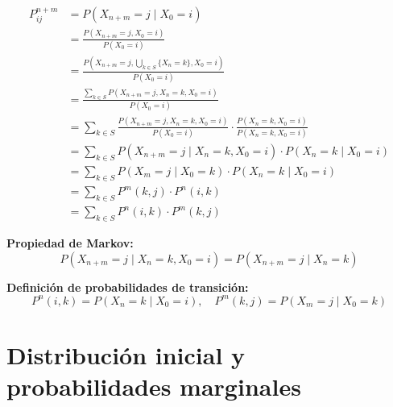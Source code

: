 \documentclass[12pt,a4paper]{article}
\begin{document}
\begin{align*}
P_{ij}^{n+m} &= P(X_{n+m}=j \mid X_0=i) \\
&= \frac{P(X_{n+m}=j, X_0=i)}{P(X_0=i)} \\
&= \frac{P(X_{n+m}=j, \bigcup_{k \in S} \{X_n=k\}, X_0=i)}{P(X_0=i)} \\
&= \frac{\sum_{k \in S} P(X_{n+m}=j, X_n=k, X_0=i)}{P(X_0=i)} \\
&= \sum_{k \in S} \frac{P(X_{n+m}=j, X_n=k, X_0=i)}{P(X_0=i)} \cdot \frac{P(X_n=k, X_0=i)}{P(X_n=k, X_0=i)} \\
&= \sum_{k \in S} P(X_{n+m}=j \mid X_n=k, X_0=i) \cdot P(X_n=k \mid X_0=i) \\
&= \sum_{k \in S} P(X_{m}=j \mid X_0=k) \cdot P(X_n=k \mid X_0=i) \\
&= \sum_{k \in S} P^m(k,j) \cdot P^n(i,k) \\
&= \sum_{k \in S} P^n(i,k) \cdot P^m(k,j)
\end{align*}

\textbf{Propiedad de Markov:}
\begin{equation*}
P(X_{n+m}=j \mid X_n=k, X_0=i) = P(X_{n+m}=j \mid X_n=k)
\end{equation*}

\textbf{Definición de probabilidades de transición:}
\begin{equation*}
P^n(i,k) = P(X_n=k \mid X_0=i), \quad P^m(k,j) = P(X_m=j \mid X_0=k)
\end{equation*}

\section*{Distribución inicial y probabilidades marginales}

\begin{center}
\end{center}
\end{document}

